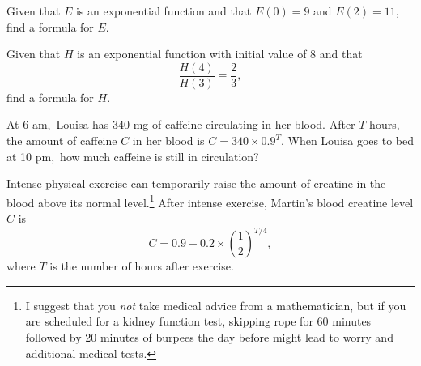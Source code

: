 \documentclass[12pt,fleqn]{exam}
\newcommand\AM{{\sc am}}
\newcommand\PM{{\sc pm}}
\begin{document}
\begin{questions} 

\question [2] Given that $E$ is an exponential function and that $E(0)=9$
and $E(2) = 11$, find a formula for $E$.

\begin{solution}[2.5in]

\end{solution}

\question [2] Given that $H$ is an exponential function with
initial value of $8$ and that
\begin{equation*}
   \frac{H(4)}{H(3)} = \frac{2}{3},
\end{equation*}
find a formula for $H$.
\begin{solution}%

\end{solution}
\vfill
\newpage

\question [2]  At 6 \AM,\, Louisa has 340 mg of caffeine circulating 
in her blood. After $T$ hours, the amount of caffeine $C$ in her blood is
\(
     C = 340  \times  0.9^T
\).
When Louisa goes to bed at 10 \PM,\, how much caffeine is
still in circulation?
\begin{solution}[1.5in]

\end{solution}

\question Intense physical exercise can temporarily raise the amount
of creatine in the blood above its normal level.\footnote{I suggest
that you \emph{not} take medical advice from a mathematician, but
if you are scheduled for a kidney function test, skipping rope
for 60 minutes followed by 20 minutes of burpees the day 
before might lead to worry and additional medical tests.} After intense exercise,
 Martin's blood creatine level $C$ is 
\begin{equation*}
    C = 0.9 + 0.2 \times \left(\frac{1}{2} \right)^{T/4},
\end{equation*}
where $T$ is the number of hours after exercise. 

\end{questions}
\end{document}
